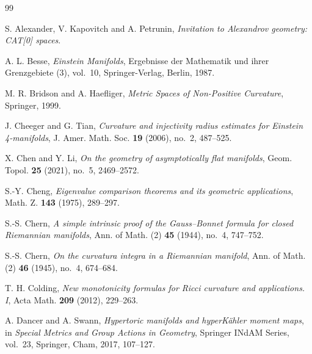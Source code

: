 \documentclass[letterpaper]{amsart}
\theoremstyle{definition}
\theoremstyle{remark}
\begin{document}
\begin{thebibliography}{99}

S. Alexander, V. Kapovitch and A. Petrunin,
\emph{Invitation to Alexandrov geometry: CAT[0] spaces}.

A. L. Besse, \emph{Einstein Manifolds},
Ergebnisse der Mathematik und ihrer Grenzgebiete (3), vol.~10,
Springer-Verlag, Berlin, 1987.

M. R. Bridson and A. Haefliger,
\emph{Metric Spaces of Non-Positive Curvature}, Springer, 1999.

J. Cheeger and G. Tian,
\emph{Curvature and injectivity radius estimates for Einstein 4-manifolds},
J. Amer. Math. Soc. \textbf{19} (2006), no.~2, 487--525.

X. Chen and Y. Li, \emph{On the geometry of asymptotically flat manifolds},
Geom. Topol. \textbf{25} (2021), no.~5, 2469--2572.

S.-Y. Cheng, \emph{Eigenvalue comparison theorems and its geometric applications},
Math. Z. \textbf{143} (1975), 289--297.

S.-S. Chern, \emph{A simple intrinsic proof of the Gauss--Bonnet formula
for closed Riemannian manifolds},
Ann. of Math. (2) \textbf{45} (1944), no.~4, 747--752.

S.-S. Chern, \emph{On the curvatura integra in a Riemannian manifold},
Ann. of Math. (2) \textbf{46} (1945), no.~4, 674--684.

T. H. Colding, \emph{New monotonicity formulas for Ricci curvature and applications. I},
Acta Math. \textbf{209} (2012), 229--263.

A. Dancer and A. Swann, \emph{Hypertoric manifolds and hyperK\"ahler moment maps},
in \emph{Special Metrics and Group Actions in Geometry},
Springer INdAM Series, vol.~23, Springer, Cham, 2017, 107--127.


\end{thebibliography}
\end{document}
